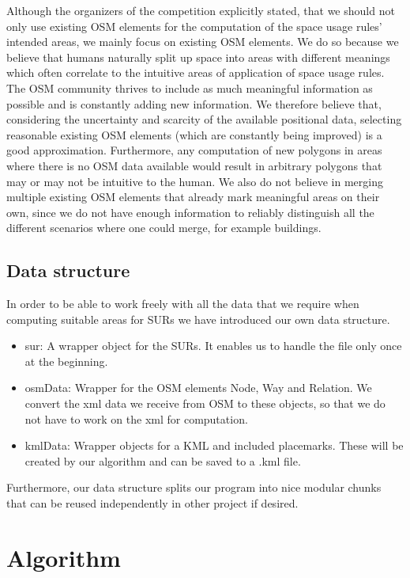 \documentclass[11pt,fleqn]{book} %
\newcommand{\todol}{\todo[inline]} %
\begin{document}
Although the organizers of the competition explicitly stated, that we should not only use existing OSM elements for the computation of the space usage rules' intended areas, we mainly focus on existing OSM elements. We do so because we believe that humans naturally split up space into areas with different meanings which often correlate to the intuitive areas of application of space usage rules. The OSM community thrives to include as much meaningful information as possible and is constantly adding new information. We therefore believe that, considering the uncertainty and scarcity of the available positional data, selecting reasonable existing OSM elements (which are constantly being improved) is a good approximation. Furthermore, any computation of new polygons in areas where there is no OSM data available would result in arbitrary polygons that may or may not be intuitive to the human. We also do not believe in merging multiple existing OSM elements that already mark meaningful areas on their own, since we do not have enough information to reliably distinguish all the different scenarios where one could merge, for example buildings.


\subsection{Data structure}
In order to be able to work freely with all the data that we require when computing suitable areas for SURs we have introduced our own data structure.
\begin{itemize}
	\item sur: A wrapper object for the SURs. It enables us to handle the file only once at the beginning.
	\item osmData: Wrapper for the OSM elements Node, Way and Relation. We convert the xml data we receive from OSM to these objects, so that we do not have to work on the xml for computation.
	\item kmlData: Wrapper objects for a KML and included placemarks. These will be created by our algorithm and can be saved to a .kml file.
\end{itemize}

Furthermore, our data structure splits our program into nice modular chunks that can be reused independently in other project if desired.

\section{Algorithm}\label{sec:algorithm}
\todol{pseudocode}
\todol{rework this section}
\end{document}
